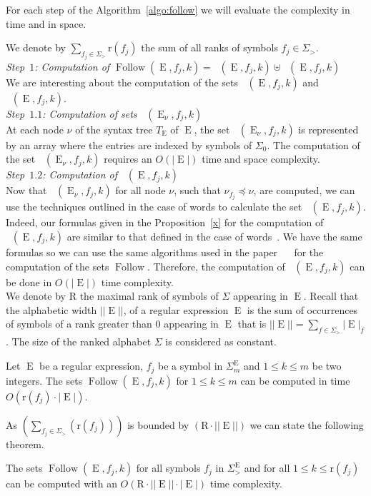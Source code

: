 \documentclass{llncs}
\DeclareMathOperator{\last}{Fl_0}
\DeclareMathOperator{\Follw}{Fl_>}
\DeclareMathOperator{\Follow}{Follow}
\DeclareMathOperator{\E}{E}
\def\Fll#1#2#3{\Follow{(#1,#2,#3)}}
\def\las#1#2#3{\last{(#1,#2,#3)}}
\def\Fw#1#2#3{\Follw{(#1,#2,#3)}}
\begin{document}
For each step of the Algorithm~\ref{algo:follow} we will evaluate the complexity in time and in space.


We denote by $\displaystyle\sum_{f_j\in\Sigma_{>}}\mathrm{r}(f_j)$ the sum of all ranks of symbols 
$f_j\in\Sigma_{>}$.\\ 

\noindent\emph{Step~$1$: Computation of $\Fll{\E}{f_j}{k}=\las{\E}{f_j}{k}\uplus\Fw{\E}{f_j}{k}$}\\
We are interesting about the computation of the sets $\las{\E}{f_j}{k}$ and $\Fw{\E}{f_j}{k}$. \\ 


\noindent\emph{Step~$1.1$: Computation of sets $\las{\E_{\nu}}{f_j}{k}$}\\

At each node $\nu$ of the syntax tree $T_{\E}$ of $\E$, the set $\las{\E_{\nu}}{f_j}{k}$ is represented by an array where the entries are indexed by symbols of $\Sigma_0$.
 The computation of the set $\las{\E_{\nu}}{f_j}{k}$ requires an $O(|\E|)$ time and space complexity.\\  

\noindent\emph{Step~$1.2$: Computation of $\Fw{\E}{f_j}{k}$}\\

Now that $\las{\E_{\nu}}{f_j}{k}$ for all node $\nu$, such that $\nu_{f_j} \preccurlyeq \nu$, are computed, we can use the techniques outlined in the case of words to calculate the set $\Fw{\E}{f_j}{k}$.  
Indeed, our formulas given in the Proposition~\ref{x} for the computation of $\Fw{\E}{f_j}{k}$ are similar to that defined in the case of words~\cite{Brug,ZPC}. We have the same formulas so we can use the same algorithms used in the paper ~~\cite{ZPC} for the computation of the sets $\Follow$.
Therefore, the computation of  $\Fw{\E}{f_j}{k}$ can be done in $O(|\E|)$ time complexity.\\

We denote by $\mathrm{R}$ the maximal rank of symbols of $\Sigma$ appearing in $\E$. Recall that the alphabetic width $||\E||$, of a regular expression $\E$ is the sum of occurrences of symbols of a rank greater than $0$ appearing in $\E$ that is $||\E||=\sum_{f\in\Sigma_{>}}{|\E|}_f$. The size of the ranked alphabet $\Sigma$ is considered as constant. 
\begin{lemma}\label{lemcomplex}
Let $\E$ be a regular expression, $f_j$ be a symbol in $\Sigma^{\E}_m$ and $1 \leq k\leq m$ be two integers. The sets $\Follow(\E,f_j,k)$ for $1 \leq k\leq m$ can be computed in time $O(\mathrm{r}(f_j)\cdot|\E|)$.
\end{lemma}
As $(\displaystyle\sum_{f_j\in\Sigma_>}(\mathrm{r}(f_j)))$ is bounded by $(\mathrm{R}\cdot||\E||)$ we can state the following theorem.
\begin{theorem}\label{thmcomplex}
The sets $\Follow(\E,f_j,k)$ for all symbols $f_j$ in $\Sigma^{\E}_{>}$ and for all $1\leq k\leq \mathrm{r}(f_j)$ can be computed with an $O(\mathrm{R}\cdot||\E||\cdot|\E|)$ time complexity.
\end{theorem}
\end{document}
